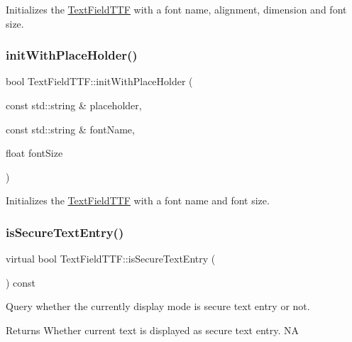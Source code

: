 Initializes the \hyperlink{classTextFieldTTF}{Text\+Field\+T\+TF} with a font name, alignment, dimension and font size. \mbox{\label{classTextFieldTTF_a03e5755fca447d202d9bd4268a407fac}} 
\subsubsection{\texorpdfstring{init\+With\+Place\+Holder()}{initWithPlaceHolder()}\hspace{0.1cm}{\footnotesize\ttfamily [4/4]}}
{\footnotesize\ttfamily bool Text\+Field\+T\+T\+F\+::init\+With\+Place\+Holder (\begin{DoxyParamCaption}\item[{const std\+::string \&}]{placeholder,  }\item[{const std\+::string \&}]{font\+Name,  }\item[{float}]{font\+Size }\end{DoxyParamCaption})}

Initializes the \hyperlink{classTextFieldTTF}{Text\+Field\+T\+TF} with a font name and font size. \mbox{\label{classTextFieldTTF_ac838afc68a8ecf7a1d8a7f2b25013a2d}} 
\subsubsection{\texorpdfstring{is\+Secure\+Text\+Entry()}{isSecureTextEntry()}\hspace{0.1cm}{\footnotesize\ttfamily [1/2]}}
{\footnotesize\ttfamily virtual bool Text\+Field\+T\+T\+F\+::is\+Secure\+Text\+Entry (\begin{DoxyParamCaption}{ }\end{DoxyParamCaption}) const\hspace{0.3cm}{\ttfamily [virtual]}}

Query whether the currently display mode is secure text entry or not. \begin{DoxyReturn}{Returns}
Whether current text is displayed as secure text entry.  NA 
\end{DoxyReturn}
\mbox{\label{classTextFieldTTF_a5ec469fe877a2fd10d7787034a7a35a0}} 
